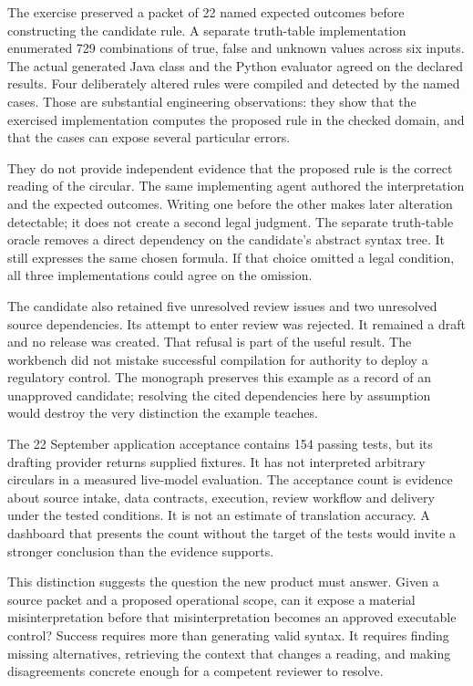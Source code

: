 The exercise preserved a packet of 22 named expected outcomes before constructing
the candidate rule. A separate truth-table implementation enumerated 729
combinations of true, false and unknown values across six inputs. The actual
generated Java class and the Python evaluator agreed on the declared results.
Four deliberately altered rules were compiled and detected by the named cases.
Those are substantial engineering observations: they show that the exercised
implementation computes the proposed rule in the checked domain, and that the
cases can expose several particular errors.

They do not provide independent evidence that the proposed rule is the correct
reading of the circular. The same implementing agent authored the interpretation
and the expected outcomes. Writing one before the other makes later alteration
detectable; it does not create a second legal judgment. The separate truth-table
oracle removes a direct dependency on the candidate's abstract syntax tree. It
still expresses the same chosen formula. If that choice omitted a legal
condition, all three implementations could agree on the omission.


The candidate also retained five unresolved review issues and two unresolved
source dependencies. Its attempt to enter review was rejected. It remained a
draft and no release was created. That refusal is part of the useful result.
The workbench did not mistake successful compilation for authority to deploy a
regulatory control. The monograph preserves this example as a record of an
unapproved candidate; resolving the cited dependencies here by assumption would
destroy the very distinction the example teaches.

The 22 September application acceptance contains 154 passing tests, but its drafting
provider returns supplied fixtures. It has not interpreted arbitrary circulars
in a measured live-model evaluation. The acceptance count is evidence about
source intake, data contracts, execution, review workflow and delivery under the
tested conditions. It is not an estimate of translation accuracy. A dashboard
that presents the count without the target of the tests would invite a stronger
conclusion than the evidence supports.

This distinction suggests the question the new product must answer. Given a
source packet and a proposed operational scope, can it expose a material
misinterpretation before that misinterpretation becomes an approved executable
control? Success requires more than generating valid syntax. It requires finding
missing alternatives, retrieving the context that changes a reading, and making
disagreements concrete enough for a competent reviewer to resolve.

